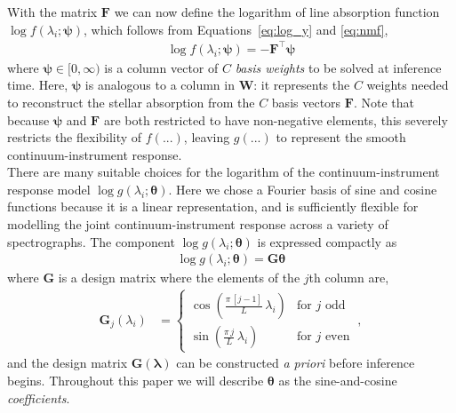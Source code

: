 \documentclass[modern]{aastex631}
\renewcommand{\vec}[1]{\mathbf{#1}}
\newcommand{\vectheta}{\boldsymbol{\theta}}
\newcommand{\vecpsi}{\boldsymbol{\psi}}
\newcommand{\vecW}{\mathbf{W}}
\newcommand{\vecH}{\mathbf{H}}
\newcommand{\vecX}{\mathbf{X}}
\newcommand{\transpose}{^\top}
\begin{document}


\noindent{}With the matrix $\vec{F}$ we can now define the logarithm of line absorption function $\log{f(\lambda_i;\vecpsi)}$, which follows from Equations~\ref{eq:log_y} and \ref{eq:nmf},
\begin{align}
    \log{f(\lambda_i;\vecpsi)} = -\vec{F}\transpose\vecpsi \label{eq:f}
\end{align}
where $\vecpsi \in [0, \infty)$ is a column vector of $C$ \emph{basis weights} to be solved at inference time. Here, $\vecpsi$ is analogous to a column in $\vecW$: it represents the $C$ weights needed to reconstruct the stellar absorption from the $C$ basis vectors $\vec{F}$. Note that because $\vecpsi$ and $\vec{F}$ are both restricted to have non-negative elements, this severely restricts the flexibility of $f(...)$, leaving $g(...)$ to represent the smooth continuum-instrument response. \\

There are many suitable choices for the logarithm of the continuum-instrument response model $\log{g(\lambda_i;\vectheta)}$. Here we chose a Fourier basis of sine and cosine functions because it is a linear representation, and is sufficiently flexible for modelling the joint continuum-instrument response across a variety of spectrographs. The component $\log{g(\lambda_i;\vectheta)}$ is expressed compactly as
\begin{align}
    \log{g(\lambda_i;\vectheta)} = \vec{G}\vectheta
\end{align}
where $\vec{G}$ is a design matrix where the elements of the $j$th column are, %
\begin{align}
    \vec{G}_{j}(\lambda_i) & = \left\{\begin{array}{cl}\displaystyle\cos\left(\frac{\pi\,[j-1]}{L}\,\lambda_i\right) & \mbox{for $j$ odd} \\[3ex]
                                       \displaystyle\sin\left(\frac{\pi\,j}{L}\,\lambda_i\right) & \mbox{for $j$ even}\end{array}\right. ~,
\end{align}
\noindent{}and the design matrix $\vec{G}(\vec{\lambda})$ can be constructed \emph{a priori} before inference begins. Throughout this paper we will describe $\vectheta$ as the sine-and-cosine \emph{coefficients}.\\
\end{document}
